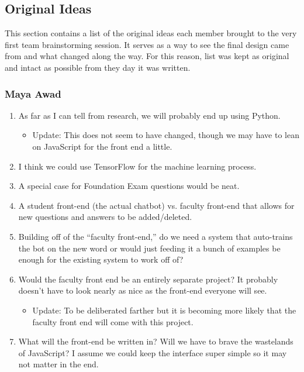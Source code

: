 \documentclass[titlepage, 12pt]{article}
\begin{document}
 


\subsection{Original Ideas}

This section contains a list of the original ideas each member brought to the very first team brainstorming session. It serves as a way to see the final design came from and what changed along the way. For this reason, list was kept as original and intact as possible from they day it was written.

\subsubsection{Maya Awad}

\begin{enumerate}
    \item As far as I can tell from research, we will probably end up using Python.
    \begin{itemize}
        \item Update: This does not seem to have changed, though we may have to lean on JavaScript for the front end a little.
    \end{itemize}
    \item I think we could use TensorFlow for the machine learning process.
    \item A special case for Foundation Exam questions would be neat.
    \item A student front-end (the actual chatbot) vs. faculty front-end that allows for new questions and answers to be added/deleted.
    \item Building off of the “faculty front-end,” do we need a system that auto-trains the bot on the new word or would just feeding it a bunch of examples be enough for the existing system to work off of?
    \item Would the faculty front end be an entirely separate project? It probably doesn’t have to look nearly as nice as the front-end everyone will see.
    \begin{itemize}
        \item Update: To be deliberated farther but it is becoming more likely that the faculty front end will come with this project.
    \end{itemize}
    \item What will the front-end be written in? Will we have to brave the wastelands of JavaScript? I assume we could keep the interface super simple so it may not matter in the end.

\end{enumerate}
\end{document}
